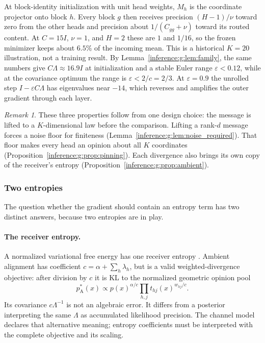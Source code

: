 \documentclass[11pt]{article}
\theoremstyle{definition}
\theoremstyle{remark}
\newtheorem{remark}[theorem]{Remark}
\begin{document}
At block-identity initialization with unit head weights, $M_h$ is the coordinate projector onto block $h$. Every block $g$ then receives precision $(H-1)/\nu$ toward zero from the other heads and precision about $1/(C_{gg}+\nu)$ toward its routed content. At $C=15I$, $\nu=1$, and $H=2$ these are $1$ and $1/16$, so the frozen minimizer keeps about $6.5\%$ of the incoming mean. This is a historical $K=20$ illustration, not a training result. By Lemma~\ref{inference:g:lem:family}, the same numbers give $C\Lambda\approx16.9 I$ at initialization and a stable Euler range $\varepsilon<0.12$, while at the covariance optimum the range is $\varepsilon<2/c=2/3$. At $\varepsilon=0.9$ the unrolled step $I-\varepsilon C\Lambda$ has eigenvalues near $-14$, which reverses and amplifies the outer gradient through each layer.

\begin{remark}
These three properties follow from one design choice: the message is lifted to a $K$-dimensional law before the comparison. Lifting a rank-$d$ message forces a noise floor for finiteness (Lemma~\ref{inference:g:lem:noise_required}). That floor makes every head an opinion about all $K$ coordinates (Proposition~\ref{inference:g:prop:pinning}). Each divergence also brings its own copy of the receiver's entropy (Proposition~\ref{inference:g:prop:ambient}).
\end{remark}

\subsubsection{Two entropies}
\label{inference:g:sec:entropy}

The question whether the gradient should contain an entropy term has two distinct answers, because two entropies are in play.

\paragraph{The receiver entropy.}
A normalized variational free energy has one receiver entropy \citep{unified:blei2017}. Ambient alignment has coefficient $c=\alpha+\sum_h\lambda_h$, but is a valid weighted-divergence objective: after division by $c$ it is KL to the normalized geometric opinion pool
\begin{equation}
p_{\mathrm A}^*(x)\propto p(x)^{\alpha/c}\prod_{h,j}t_{hj}(x)^{w_{hj}/c}.
\label{inference:g:eq:opinion_pool}
\end{equation}
Its covariance $c\Lambda^{-1}$ is not an algebraic error. It differs from a posterior interpreting the same $\Lambda$ as accumulated likelihood precision. The channel model declares that alternative meaning; entropy coefficients must be interpreted with the complete objective and its scaling.
\end{document}
